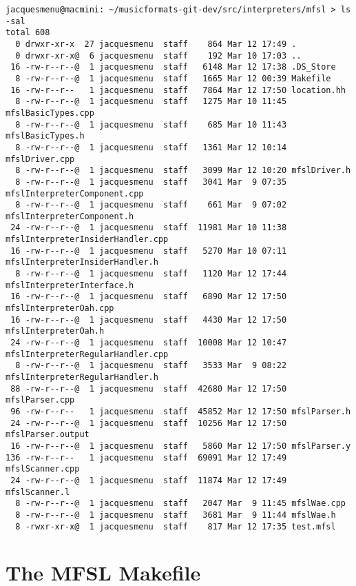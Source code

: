 \begin{lstlisting}[language=TerminalSmall]
jacquesmenu@macmini: ~/musicformats-git-dev/src/interpreters/mfsl > ls -sal
total 608
  0 drwxr-xr-x  27 jacquesmenu  staff    864 Mar 12 17:49 .
  0 drwxr-xr-x@  6 jacquesmenu  staff    192 Mar 10 17:03 ..
 16 -rw-r--r--@  1 jacquesmenu  staff   6148 Mar 12 17:38 .DS_Store
  8 -rw-r--r--@  1 jacquesmenu  staff   1665 Mar 12 00:39 Makefile
 16 -rw-r--r--   1 jacquesmenu  staff   7864 Mar 12 17:50 location.hh
  8 -rw-r--r--@  1 jacquesmenu  staff   1275 Mar 10 11:45 mfslBasicTypes.cpp
  8 -rw-r--r--@  1 jacquesmenu  staff    685 Mar 10 11:43 mfslBasicTypes.h
  8 -rw-r--r--@  1 jacquesmenu  staff   1361 Mar 12 10:14 mfslDriver.cpp
  8 -rw-r--r--@  1 jacquesmenu  staff   3099 Mar 12 10:20 mfslDriver.h
  8 -rw-r--r--@  1 jacquesmenu  staff   3041 Mar  9 07:35 mfslInterpreterComponent.cpp
  8 -rw-r--r--@  1 jacquesmenu  staff    661 Mar  9 07:02 mfslInterpreterComponent.h
 24 -rw-r--r--@  1 jacquesmenu  staff  11981 Mar 10 11:38 mfslInterpreterInsiderHandler.cpp
 16 -rw-r--r--@  1 jacquesmenu  staff   5270 Mar 10 07:11 mfslInterpreterInsiderHandler.h
  8 -rw-r--r--@  1 jacquesmenu  staff   1120 Mar 12 17:44 mfslInterpreterInterface.h
 16 -rw-r--r--@  1 jacquesmenu  staff   6890 Mar 12 17:50 mfslInterpreterOah.cpp
 16 -rw-r--r--@  1 jacquesmenu  staff   4430 Mar 12 17:50 mfslInterpreterOah.h
 24 -rw-r--r--@  1 jacquesmenu  staff  10008 Mar 12 10:47 mfslInterpreterRegularHandler.cpp
  8 -rw-r--r--@  1 jacquesmenu  staff   3533 Mar  9 08:22 mfslInterpreterRegularHandler.h
 88 -rw-r--r--@  1 jacquesmenu  staff  42680 Mar 12 17:50 mfslParser.cpp
 96 -rw-r--r--   1 jacquesmenu  staff  45852 Mar 12 17:50 mfslParser.h
 24 -rw-r--r--@  1 jacquesmenu  staff  10256 Mar 12 17:50 mfslParser.output
 16 -rw-r--r--@  1 jacquesmenu  staff   5860 Mar 12 17:50 mfslParser.y
136 -rw-r--r--   1 jacquesmenu  staff  69091 Mar 12 17:49 mfslScanner.cpp
 24 -rw-r--r--@  1 jacquesmenu  staff  11874 Mar 12 17:49 mfslScanner.l
  8 -rw-r--r--@  1 jacquesmenu  staff   2047 Mar  9 11:45 mfslWae.cpp
  8 -rw-r--r--@  1 jacquesmenu  staff   3681 Mar  9 11:44 mfslWae.h
  8 -rwxr-xr-x@  1 jacquesmenu  staff    817 Mar 12 17:35 test.mfsl
\end{lstlisting}


\section{The MFSL Makefile}\label{The MFSL Makefile}


